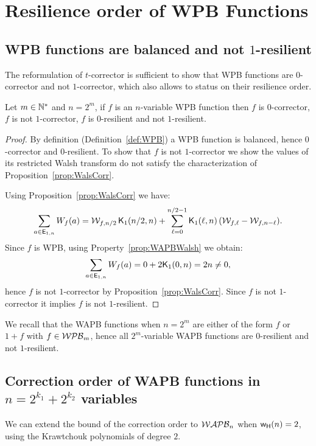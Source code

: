 \documentclass[11pt]{llncs}
\begin{document}
\section{Resilience order of WPB Functions}


\subsection{WPB functions are balanced and not $1$-resilient}
The reformulation of $t$-corrector is sufficient to show that WPB functions are $0$-corrector and not $1$-corrector, which also allows to status on their resilience order.

\begin{theorem}\label{thm:WPB}
	Let $m\in \mathbb{N}^*$ and $n=2^m$, if $f$ is an $n$-variable WPB function then $f$ is $0$-corrector, $f$ is not $1$-corrector, $f$ is $0$-resilient and not $1$-resilient.
\end{theorem}
\begin{proof}
	By definition (Definition~\ref{def:WPB}) a WPB function is balanced, hence $0$-corrector and $0$-resilient.
	To show that $f$ is not $1$-corrector we show the values of its restricted Walsh transform do not satisfy the characterization of Proposition~\ref{prop:WalsCorr}.

	Using Proposition~\ref{prop:WalsCorr} we have:
	\[\sum_{a\in \mathsf{E}_{1,n}} W_{f}(a)=\mathcal{W}_{f,n/2} \, \mathsf{K}_{1}(n/2,n)+ \sum_{\ell=0}^{n/2-1} \mathsf{K}_{1}(\ell,n) \, ( \mathcal{W}_{f,\ell} - \mathcal{W}_{f,n-\ell}).\]
	Since $f$ is WPB, using Property~\ref{prop:WAPBWalsh} we obtain:
	\[\sum_{a\in \mathsf{E}_{1,n}} W_{f}(a)=0+2\mathsf{K}_{1}(0,n)=2n\ne 0,\]
	hence $f$ is not $1$-corrector by Proposition~\ref{prop:WalsCorr}. Since $f$ is not $1$-corrector it implies $f$ is not $1$-resilient.

\end{proof}

We recall that the WAPB functions when $n=2^m$ are either of the form $f$ or $1+f$ with $f\in \mathcal{WPB}_{m}$, hence all $2^m$-variable WAPB functions are $0$-resilient and not $1$-resilient.



\subsection{Correction order of WAPB functions in $n=2^{k_1} + 2^{k_2}$ variables}

We can extend the bound of the correction order to $\mathcal{WAPB}_{n}$ when $\mathsf{w_H}(n)=2$, using the Krawtchouk polynomials of degree $2$.
\end{document}
